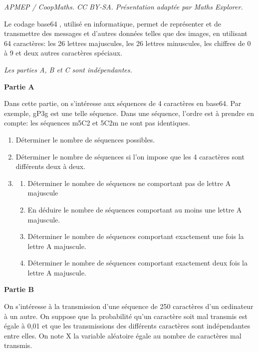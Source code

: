 \documentclass[10pt]{article}
\begin{document}
\noindent\textit{APMEP / CoopMaths. CC BY-SA. Présentation adaptée par Maths Explorer.}\par\medskip
Le codage \og base64 \fg, utilisé en informatique, permet de représenter et de transmettre des messages et d'autres données telles que des images, en utilisant 64 caractères: les 26 lettres majuscules, les 26 lettres minuscules, les chiffres de 0 à 9 et deux autres caractères spéciaux.

\emph{Les parties {\rm A, B} et {\rm C} sont indépendantes.}

\medskip

\textbf{Partie A}

\medskip

Dans cette partie, on s'intéresse aux séquences de 4 caractères en base64.
Par exemple, \og gP3g \fg est une telle séquence.
Dans une séquence, l'ordre est à prendre en compte: les séquences \og m5C2 \fg et \og 5C2m \fg ne sont pas identiques.

\medskip

\begin{enumerate}
\item Déterminer le nombre de séquences possibles.
\item Déterminer le nombre de séquences si l'on impose que les 4 caractères sont
différents deux à deux.
\item 
	\begin{enumerate}
		\item Déterminer le nombre de séquences ne comportant pas de lettre A majuscule
		\item En déduire le nombre de séquences comportant au moins une lettre A majuscule.
		\item Déterminer le nombre de séquences comportant exactement une fois la lettre A majuscule.
		\item Déterminer le nombre de séquences comportant exactement deux fois la lettre A majuscule.
	\end{enumerate}
\end{enumerate}

\medskip

\textbf{Partie B}

\medskip

On s'intéresse à la transmission d'une séquence de 250 caractères d'un ordinateur à un autre. On suppose que la probabilité qu'un caractère soit mal transmis est égale à 0,01 et que les transmissions des différents caractères sont indépendantes entre elles.
On note X la variable aléatoire égale au nombre de caractères mal transmis.
\end{document}
